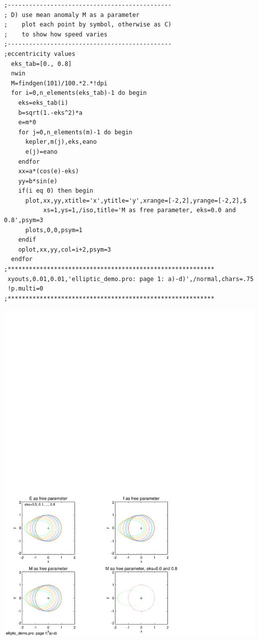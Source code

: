 \documentclass[a4paper,12pt]{article}
\def\black{\color{RGBblack}}
\begin{document}
{{{\begin{verbatim}
;----------------------------------------------
; D) use mean anomaly M as a parameter
;    plot each point by symbol, otherwise as C)
;    to show how speed varies
;----------------------------------------------
;eccentricity values
  eks_tab=[0., 0.8]
  nwin
  M=findgen(101)/100.*2.*!dpi
  for i=0,n_elements(eks_tab)-1 do begin
    eks=eks_tab(i)
    b=sqrt(1.-eks^2)*a
    e=m*0
    for j=0,n_elements(m)-1 do begin
      kepler,m(j),eks,eano
      e(j)=eano
    endfor
    xx=a*(cos(e)-eks)
    yy=b*sin(e)
    if(i eq 0) then begin
      plot,xx,yy,xtitle='x',ytitle='y',xrange=[-2,2],yrange=[-2,2],$
           xs=1,ys=1,/iso,title='M as free parameter, eks=0.0 and 0.8',psym=3
      plots,0,0,psym=1
    endif
    oplot,xx,yy,col=i+2,psym=3
  endfor
;**********************************************************
 xyouts,0.01,0.01,'elliptic_demo.pro: page 1: a)-d)',/normal,chars=.75
 !p.multi=0
;**********************************************************

\end{verbatim} \black

\vspace{-17cm}
\includegraphics[width=1.1\paperwidth,height=1.1\paperheight]{elliptic_demo_1.pdf}
\clearpage

}}}
\end{document}
